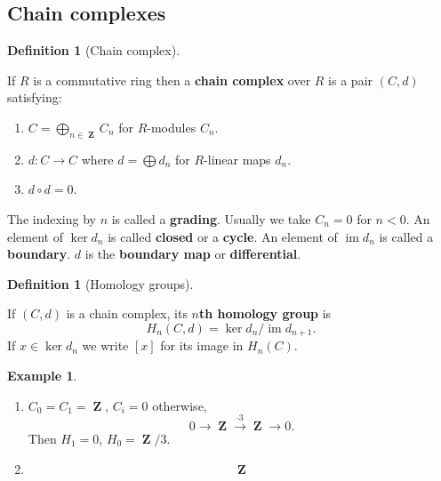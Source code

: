 \documentclass[10pt,]{article}
\newcommand{\lt}{<}
\newcommand{\terminology}[1]{\textbf{#1}}
\theoremstyle{plain}
\theoremstyle{definition}
\newtheorem{definition}[theorem]{Definition}
\newtheorem{example}[theorem]{Example}
\DeclareMathOperator{\im}{im}
\DeclareMathOperator{\ZZ}{\mathbf{Z}}
\begin{document}
\subsection[Chain complexes]{Chain complexes}\label{subsection-3}
\begin{definition}[Chain complex]\label{definition-6}

                        If \(R\) is a commutative ring then a \terminology{chain complex} over \(R\) is a pair \((C,d)\) satisfying:
                        \begin{enumerate}
\item{}\(C = \bigoplus_{n\in\ZZ} C_n\) for \(R\)-modules \(C_n\).\item{}\(d\colon C \to C\) where \(d = \bigoplus d_n\) for \(R\)-linear maps \(d_n\).\item{}\(d\circ d = 0\).\end{enumerate}

                        The indexing by \(n\) is called a \terminology{grading}.
                        Usually we take \(C_n = 0\) for \(n \lt 0\).
                        An element of \(\ker d_n\) is called \terminology{closed} or a \terminology{cycle}.
                        An element of \(\im d_n\) is called a \terminology{boundary}.
                        \(d\) is the \terminology{boundary map} or \terminology{differential}.
                    \end{definition}
\begin{definition}[Homology groups]\label{definition-7}

                        If \((C,d)\) is a chain complex, its \terminology{\(n\)th homology group} is
                        \[H_n(C,d) = \ker d_n/\im d_{n+1}.\]
                        If \(x \in \ker d_n\) we write \([x]\) for its image in \(H_n(C)\).
                    \end{definition}
\begin{example}\label{example-4}
\begin{enumerate}
\item{}
                            \(C_0 = C_1 = \ZZ\), \(C_i = 0\) otherwise,
                            \[0\to \ZZ \xrightarrow{\cdot 3} \ZZ \to 0.\]
                            Then \(H_1 = 0\), \(H_0 = \ZZ/3\).
                        \item{}
                            \[\ZZ\]
                        \end{enumerate}
\end{example}
\typeout{************************************************}
\typeout{************************************************}
\end{document}
